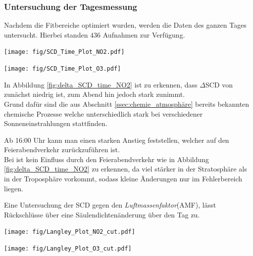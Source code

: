 \documentclass[12pt, a4paper, bibliography=totoc]{scrartcl}
\begin{document}
\begin{multicols}{2}
\subsubsection{Untersuchung der Tagesmessung}\label{sssec:tagesmessung}

Nachdem die Fitbereiche optimiert wurden, werden die Daten des ganzen Tages untersucht. 
Hierbei standen $436$ Aufnahmen zur Verfügung.


\begin{center}
	\texttt{[image: fig/SCD\_Time\_Plot\_NO2.pdf]}
	\label{fig:delta_SCD_time_NO2}
\end{center}
       
\begin{center}
	\texttt{[image: fig/SCD\_Time\_Plot\_O3.pdf]}
	\label{fig:delta_SCD_time_O3}
\end{center}       

In Abbildung \ref{fig:delta_SCD_time_NO2} ist zu erkennen, dass $\Delta$SCD von  zunächst niedrig ist, zum Abend hin jedoch stark zunimmt.\\
Grund dafür sind die aus Abschnitt \ref{ssec:chemie_atmosphäre} bereits bekannten chemische Prozesse welche unterschiedlich stark bei verschiedener Sonneneinstrahlungen stattfinden.

Ab 16:00 Uhr kann man einen starken Anstieg feststellen, welcher auf den Feierabendverkehr zurückzuführen ist.\\

Bei  ist kein Einfluss durch den Feierabendverkehr wie in Abbildung \ref{fig:delta_SCD_time_NO2} zu erkennen, da  viel stärker in der Stratosphäre als in der Troposphäre vorkommt, sodass kleine  Änderungen nur im Fehlerbereich liegen.


Eine Untersuchung der SCD gegen den \textit{Luftmassenfaktor}(AMF), lässt Rückschlüsse über eine Säulendichtenänderung über den Tag zu.

\begin{center}
	\texttt{[image: fig/Langley\_Plot\_NO2\_cut.pdf]}
	\label{fig:langley_NO2}
\end{center}

\begin{center}
	\texttt{[image: fig/Langley\_Plot\_O3\_cut.pdf]}
	\label{fig:langley_O3}
\end{center}


\end{multicols}
\end{document}
